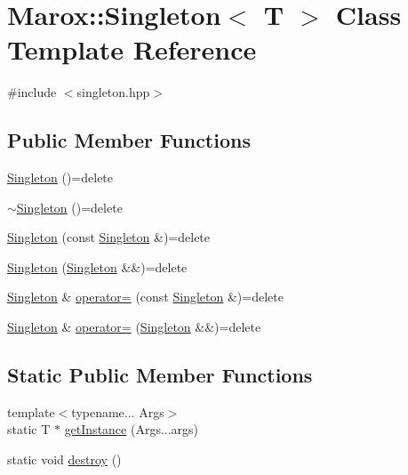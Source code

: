 \hypertarget{class_marox_1_1_singleton}{}\section{Marox\+:\+:Singleton$<$ T $>$ Class Template Reference}
\label{class_marox_1_1_singleton}


{\ttfamily \#include $<$singleton.\+hpp$>$}

\subsection*{Public Member Functions}
\begin{DoxyCompactItemize}
\item 
\hyperlink{class_marox_1_1_singleton_a7b44aabd3476e25a134ac10b2b9c7979}{Singleton} ()=delete
\item 
\hyperlink{class_marox_1_1_singleton_a66e48fe118e78fe19809fe21f8222155}{$\sim$\+Singleton} ()=delete
\item 
\hyperlink{class_marox_1_1_singleton_acc6f6672645191fab7dd1adb8aa0cc8e}{Singleton} (const \hyperlink{class_marox_1_1_singleton}{Singleton} \&)=delete
\item 
\hyperlink{class_marox_1_1_singleton_a40fa77811b897872de4b39492d7ee274}{Singleton} (\hyperlink{class_marox_1_1_singleton}{Singleton} \&\&)=delete
\item 
\hyperlink{class_marox_1_1_singleton}{Singleton} \& \hyperlink{class_marox_1_1_singleton_ab221f03c611a161d22b9de11f6a52e4b}{operator=} (const \hyperlink{class_marox_1_1_singleton}{Singleton} \&)=delete
\item 
\hyperlink{class_marox_1_1_singleton}{Singleton} \& \hyperlink{class_marox_1_1_singleton_a579039c039f7155515292341db2e2ee5}{operator=} (\hyperlink{class_marox_1_1_singleton}{Singleton} \&\&)=delete
\end{DoxyCompactItemize}
\subsection*{Static Public Member Functions}
\begin{DoxyCompactItemize}
\item 
{\footnotesize template$<$typename... Args$>$ }\\static T $\ast$ \hyperlink{class_marox_1_1_singleton_abc5301f558b5f4bc8a99c6834296e6e2}{get\+Instance} (Args...\+args)
\item 
static void \hyperlink{class_marox_1_1_singleton_afd18cf048e3936321cc1f03775995828}{destroy} ()
\end{DoxyCompactItemize}


